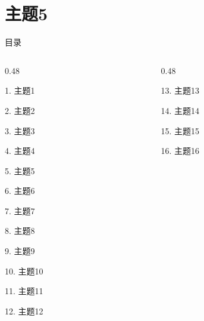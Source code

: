 \documentclass[aspectratio=169,10pt,fontset=fandol]{ctexbeamer}
\begin{document}
\section{主题5}
\begin{frame}[t,fragile]{目录}
\small
\begin{columns}[T,onlytextwidth]
\begin{column}{0.48\textwidth}
{\color{black}\small 1. 主题1\par}\vspace{0.22em}
{\color{black}\small 2. 主题2\par}\vspace{0.22em}
{\color{black}\small 3. 主题3\par}\vspace{0.22em}
{\color{black}\small 4. 主题4\par}\vspace{0.22em}
{\color{blue}\small 5. 主题5\par}\vspace{0.22em}
{\color{gray!40}\small 6. 主题6\par}\vspace{0.22em}
{\color{gray!40}\small 7. 主题7\par}\vspace{0.22em}
{\color{gray!40}\small 8. 主题8\par}\vspace{0.22em}
{\color{gray!40}\small 9. 主题9\par}\vspace{0.22em}
{\color{gray!40}\small 10. 主题10\par}\vspace{0.22em}
{\color{gray!40}\small 11. 主题11\par}\vspace{0.22em}
{\color{gray!40}\small 12. 主题12\par}\vspace{0.22em}
\end{column}
\begin{column}{0.48\textwidth}
{\color{gray!40}\small 13. 主题13\par}\vspace{0.22em}
{\color{gray!40}\small 14. 主题14\par}\vspace{0.22em}
{\color{gray!40}\small 15. 主题15\par}\vspace{0.22em}
{\color{gray!40}\small 16. 主题16\par}\vspace{0.22em}

\end{column}
\end{columns}
\end{frame}
\end{document}
